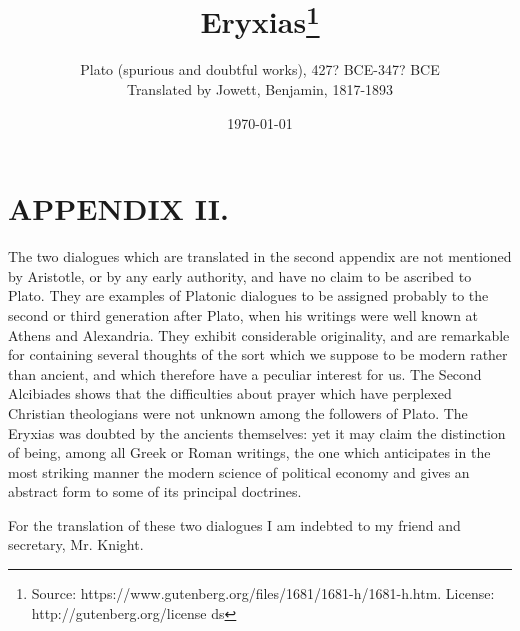 \documentclass[11pt,letter]{article}
\begin{document}
\title{Eryxias\thanks{Source: https://www.gutenberg.org/files/1681/1681-h/1681-h.htm. License: http://gutenberg.org/license ds}}
\date{\today}
\author{Plato (spurious and doubtful works), 427? BCE-347? BCE\\ Translated by Jowett, Benjamin, 1817-1893}
\maketitle

\setcounter{tocdepth}{1}
\tableofcontents
\renewcommand{\baselinestretch}{1.0}
\normalsize
\newpage

\section{
      APPENDIX II.
    }
\par  The two dialogues which are translated in the second appendix are not mentioned by Aristotle, or by any early authority, and have no claim to be ascribed to Plato. They are examples of Platonic dialogues to be assigned probably to the second or third generation after Plato, when his writings were well known at Athens and Alexandria. They exhibit considerable originality, and are remarkable for containing several thoughts of the sort which we suppose to be modern rather than ancient, and which therefore have a peculiar interest for us. The Second Alcibiades shows that the difficulties about prayer which have perplexed Christian theologians were not unknown among the followers of Plato. The Eryxias was doubted by the ancients themselves: yet it may claim the distinction of being, among all Greek or Roman writings, the one which anticipates in the most striking manner the modern science of political economy and gives an abstract form to some of its principal doctrines.

\par  For the translation of these two dialogues I am indebted to my friend and secretary, Mr. Knight.
\end{document}

